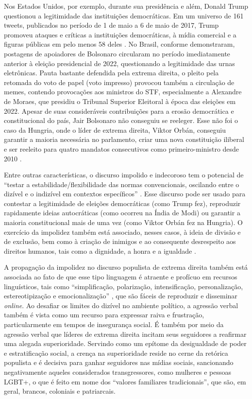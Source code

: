 \documentclass[portuguese]{textolivre}
\begin{document}
Nos Estados Unidos, por exemplo, durante sua presidência e além, Donald Trump questionou a legitimidade das instituições democráticas. Em um universo de 161 tweets, publicados no período de 1 de maio a 6 de maio de 2017, Trump promoveu ataques e críticas a instituições democráticas, à mídia comercial e a figuras públicas em pelo menos 58 deles \cite{koike2018}. No Brasil, conforme \textcite{oliveira2024} demonstraram, postagens de apoiadores de Bolsonaro circularam no período imediatamente anterior à eleição presidencial de 2022, questionando a legitimidade das urnas eletrônicas. Pauta bastante defendida pela extrema direita, o pleito pela retomada do voto de papel (voto impresso) provocou também a circulação de memes, contendo provocações aos ministros do STF, especialmente a Alexandre de Moraes, que presidiu o Tribunal Superior Eleitoral à época das eleições em 2022. Apesar de suas consideráveis contribuições para a erosão democrática e constitucional do país, Jair Bolsonaro não conseguiu se reeleger. Esse não foi o caso da Hungria, onde o líder de extrema direita, Viktor Orbán, conseguiu garantir a maioria necessária no parlamento, criar uma nova constituição iliberal e ser reeleito para quatro mandatos consecutivos como primeiro-ministro desde 2010 \cite{drinoczi-agnieska2022}.

Entre outras características, o discurso impolido e indecoroso tem o potencial de ``testar a estabilidade/flexibilidade das normas convencionais, oscilando entre o dizível e o indizível em contextos específicos'' \cite[p. 388]{wodak2021culpeper}. Esse discurso pode ser usado para contestar a legitimidade de eleições democráticas (como Trump fez), reproduzir rapidamente ideias autocráticas (como ocorreu na Índia de Modi) ou garantir a maioria constitucional mais de uma vez (como Viktor Orbán fez na Hungria). O exercício da impolidez também está associado, nesses casos, à ideia de divisão e de exclusão, bem como à criação de inimigos e ao consequente desrespeito aos direitos humanos, tais como a dignidade, a honra e a igualdade \cite{andrade2019, drinoczi-agnieska2022, drinoczi2022}.  

A propagação da impolidez no discurso populista de extrema direita também está associada ao fato de que esse tipo linguagem é atraente e profícuo em recursos linguísticos, tais como ``simplificação, polarização, intensificação, personalização, estereotipização e emocionalização'' \cite{wodak2021culpeper}, que são fáceis de reproduzir e disseminar \textit{online}. Ao desafiar os limites do dizível no ambiente político, a agressão verbal também é vista como um recurso para expressar raiva e frustração, particularmente em tempos de insegurança social. É também por meio da agressão verbal que líderes de extrema direita incitam seus seguidores a reafirmar uma alegada superioridade. Servindo como um epítome da desigualdade de poder e estratificação social, a crença na superioridade reside no cerne da retórica populista e é decisiva para ganhar seguidores nas mídias sociais, sancionando negativamente aqueles considerados transgressores, como mulheres e pessoas LGBT+, o que é feito em nome dos ``valores familiares tradicionais'', que são, em geral, brancos, coloniais e patriarcais.
\end{document}
